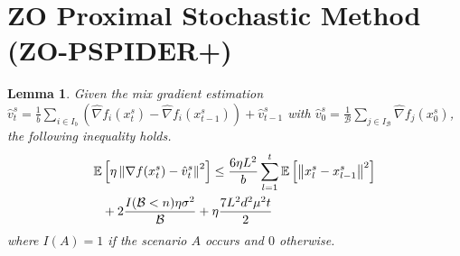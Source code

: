 \documentclass[iicol,sn-basic]{sn-jnl}
\theoremstyle{thmstyleone}%
\theoremstyle{thmstyletwo}%
\theoremstyle{thmstylethree}%
\newcommand*{\E}{\mathbb{E}}
\newcommand{\norm}[1]{\left\lVert#1\right\rVert}
\newtheorem{lemma}[theorem]{Lemma}
\begin{document}
\section{ZO Proximal Stochastic Method (ZO-PSPIDER+)}

\begin{lemma}\label{spider-var-estimate-lem}
Given the mix gradient estimation $\hat{v}_{t}^s = \frac{1}{b} \sum_{i\in I_b}\left(\hat{\nabla} f_{i}(x_{t}^s)-\hat{\nabla} f_{i}({x}_{t-1}^s)\right)+\hat{v}_{t-1}^s$ with $\hat{v}_{0}^s = \frac{1}{\mathcal{B}} \sum_{j\in I_{\mathcal{B}}} \hat{\nabla} f_j (x_0^{s})$, the following inequality holds. 
\begin{align}
\E&\left[\eta\norm{\nabla f(x_{t}^s)-{\hat{v}_{t}^s}}^2\right] \leq  \frac{6\eta L^2}{b}\sum_{l = 1}^{t} \E\left[\norm{x_{l}^s-{x}_{l-1}^s}^2\right]\notag\\
&+ 2\frac{I(\mathcal{B} < n)\eta \sigma ^2}{\mathcal{B}}+\eta \frac{7 L^2 d^2 \mu^2 t}{2}
\end{align}
where $I(A) = 1$ if the scenario $A$ occurs and $0$ otherwise.
\end{lemma}
\end{document}
